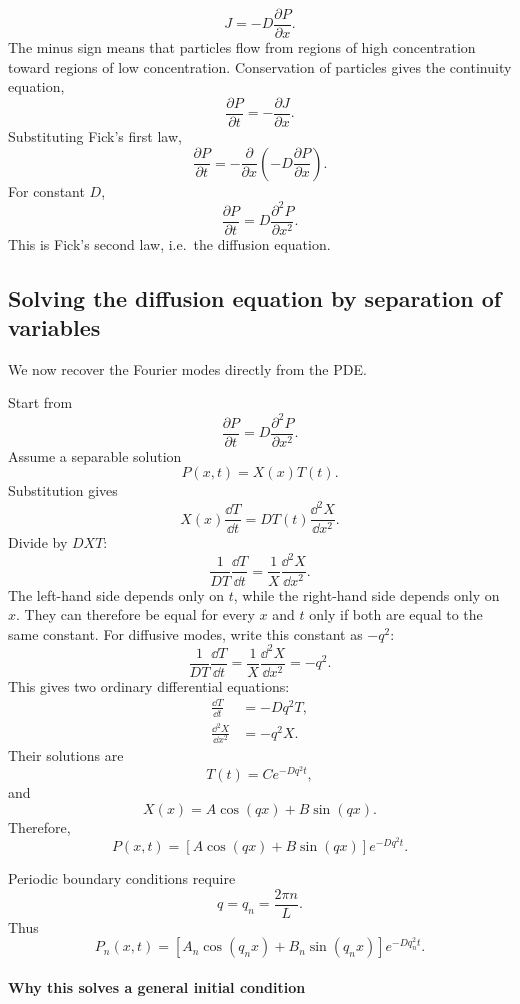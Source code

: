 \[
    \boxed{
        J = -D\frac{\partial P}{\partial x}.
    }
\]
% 
The minus sign means that particles flow from regions of high
concentration toward regions of low concentration.
% 
Conservation of particles gives the continuity equation,
% 
\[
    \frac{\partial P}{\partial t} = -\frac{\partial J}{\partial x}.
\]
% 
Substituting Fick's first law,
% 
\[
    \frac{\partial P}{\partial t} = -\frac{\partial}{\partial x} \left( -D\frac{\partial P}{\partial x} \right).
\]
% 
For constant $D$,
% 
\[
    \boxed{
        \frac{\partial P}{\partial t} = D\frac{\partial^2P}{\partial x^2}.
    }
\]
% 
This is Fick's second law, i.e.\ the diffusion equation.


\subsection{Solving the diffusion equation by separation of variables}

We now recover the Fourier modes directly from the PDE.

Start from
% 
\[
    \frac{\partial P}{\partial t} = D\frac{\partial^2P}{\partial x^2}.
\]
% 
Assume a separable solution
% 
\[
    P(x,t) = X(x) T(t).
\]
% 
Substitution gives
% 
\[
    X(x)\frac{\dd T}{\dd t} = DT(t)\frac{\dd^2X}{\dd x^2}.
\]
% 
Divide by $DXT$:
% 
\[
    \frac{1}{DT} \frac{\dd T}{\dd t} = \frac{1}{X} \frac{\dd^2X}{\dd x^2}.
\]
% 
The left-hand side depends only on $t$, while the right-hand side depends only on $x$. 
They can therefore be equal for every $x$ and $t$ only if both are equal to the same constant.
For diffusive modes, write this constant as $-q^2$:
% 
\[
    \frac{1}{DT} \frac{\dd T}{\dd t} = \frac{1}{X} \frac{\dd^2X}{\dd x^2} = -q^2.
\]
% 
This gives two ordinary differential equations:
% 
\begin{align*}
    \frac{\dd T}{\dd t} &= -Dq^2T,
    \\
    \frac{\dd^2X}{\dd x^2} &= -q^2X.
\end{align*}
% 
Their solutions are
% 
\[
    T(t) = Ce^{-Dq^2t},
\]
% 
and
% 
\[
    X(x) = A\cos(qx) + B\sin(qx).
\]
% 
Therefore,
% 
\[
    P(x,t) = \left[ A\cos(qx)+B\sin(qx) \right] e^{-Dq^2t}.
\]

Periodic boundary conditions require
% 
\[
    q = q_n = \frac{2\pi n}{L}.
\]
% 
Thus
% 
\[
\boxed{
    P_n(x,t) = \left[ A_n\cos(q_nx) + B_n\sin(q_nx) \right] e^{-Dq_n^2t}.
}
\]
% 
% 
\medskip
\\
\textbf{Why this solves a general initial condition}

